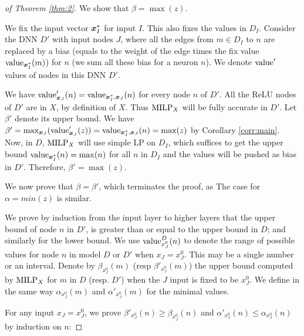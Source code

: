 			
\begin{proof}[of Theorem \ref{thm:2}]
	We show that $\beta=\max(z)$.

	We fix the input vector $\boldsymbol{x}^*_I$ for input $I$.
	This also fixes the values in $D_I$.
	Consider the DNN $D'$ with input nodes $J$, where all the 
	edges from $m \in D_I$ to $n$ are replaced by a bias (equals to the weight of the edge times the fix value ${\textrm{value}}_{\boldsymbol{x}^*_I}(m)$) for $n$ (we sum all these bias for a neuron $n$). We denote ${\textrm{value}}'$ values of nodes in this DNN $D'$.
		 
	We have ${\textrm{value}}'_{\boldsymbol{x}_J}(n)={\textrm{value}}_{\boldsymbol{x}^*_I,\boldsymbol{x}_J}(n)$ 
	for every node $n$ of $D'$. All the ReLU nodes of $D'$ are in $X$, by definition of $X$.
Thus ${\textrm{MILP}}_X$ will be fully accurate in $D'$. Let $\beta'$ denote its upper bound.
We have $\beta'=\max_{\boldsymbol{x}{_J}} ({\textrm{value}}'_{\boldsymbol{x}_{J}}(z)) = 
{\textrm{value}}_{\boldsymbol{x}^*_I,\boldsymbol{x}_J}(n) = \max(z)$ by Corollary \ref{corr:main}.
Now, in $D$, ${\textrm{MILP}}_X$ will use simple LP on $D_I$, which suffices to get the upper bound ${\textrm{value}}_{\boldsymbol{x}^*_I}(n)=\max(n)$ for all $n$ in $D_I$ and the values will be pushed as bias in $D'$. Therefore, $\beta'=\max(z)$.

We now prove that $\beta=\beta'$, which terminates the proof, as The case for $\alpha=min(z)$ is similar. 

We prove by induction from the input layer to higher layers that the upper bound of node $n$ in $D'$, is greater than or equal to the upper bound in $D$; and similarly for the lower bound. We use  ${\textrm{value}}^{D}_{x_J^0}(n)$ to denote the range of possible values for node $n$ in  model $D$ or $D'$ when $x_J=x_J^0$. 
This may be a single number or an interval. 
Denote by $\beta_{x_J^0}(m)$ (resp $\beta'_{x_J^0}(m)$) the upper bound computed by ${\textrm{MILP}}_X$ 
for $m$ in $D$ (resp. $D'$) when the $J$ input is fixed to be ${x_J^0}$.
We define in the same way  $\alpha_{x_J^0}(m)$ and $\alpha'_{x_J^0}(m)$ for the minimal values.

For any input $x_J=x_J^0$, we prove $\beta'_{x_J^0}(n) \geq \beta_{x_J^0}(n)$ 
and
$\alpha'_{x_J^0}(n) \leq \alpha_{x_J^0}(n)$ 
by induction on $n$:



\end{proof}
